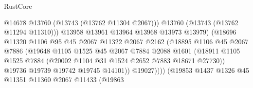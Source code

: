 \begin{lexlean}{RustCore}
\begin{coremodule}
                                            @14678
                                            @13760
                                            (@13743 (@13762 @11304 @2067)))
                                          @13760
                                          (@13743 (@13762 @11294 @11310)))
                                        @13958
                                        @13961
                                        @13964
                                        @13968
                                        @13973
                                        @13979)
                                      (@18696
                                        @11320
                                        @1106
                                        @95
                                        @45
                                        @2067
                                        @11322
                                        @2067
                                        @2162
                                        (@18895
                                          @1106
                                          @45
                                          @2067
                                          @7886
                                          (@19648
                                            @1105
                                            @1525
                                            @45
                                            @2067
                                            @7884
                                            @2088
                                            @1601
                                            (@18911
                                              @1105
                                              @1525
                                              @7884
                                              (@20002 @1104 @31 @1524 @2652 @7883 @18671 @27730))
                                            @19736
                                            @19739
                                            @19742
                                            @19745
                                            @14101))
                                        @19027))))
                                (@19853
                                  @1437
                                  @1326
                                  @45
                                  @11351
                                  @11360
                                  @2067
                                  @11433
                                  (@19863

\end{coremodule}
\end{lexlean}
